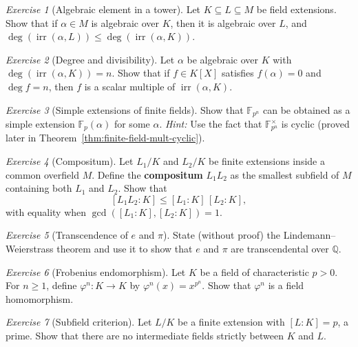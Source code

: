 \documentclass[12pt,a4paper,openany]{book}
\theoremstyle{definition}
\theoremstyle{remark}
\newtheorem{exercise}{Exercise}[chapter]
\newcommand{\Q}{\mathbb{Q}}
\newcommand{\F}{\mathbb{F}}
\renewcommand{\deg}{\operatorname{deg}}
\DeclareMathOperator{\irr}{irr}
\begin{document}
\begin{exercise}[Algebraic element in a tower]
\label{exer:algebraic-tower}
Let $K \subseteq L \subseteq M$ be field extensions. Show that if
$\alpha \in M$ is algebraic over $K$, then it is algebraic over $L$,
and $\deg(\irr(\alpha, L)) \le \deg(\irr(\alpha, K))$.
\end{exercise}

\begin{exercise}[Degree and divisibility]
\label{exer:degree-divides}
Let $\alpha$ be algebraic over $K$ with $\deg(\irr(\alpha,K)) = n$.
Show that if $f \in K[X]$ satisfies $f(\alpha) = 0$ and
$\deg f = n$, then $f$ is a scalar multiple of $\irr(\alpha,K)$.
\end{exercise}

\begin{exercise}[Simple extensions of finite fields]
\label{exer:simple-ext-finite}
Show that $\F_{p^n}$ can be obtained as a simple extension
$\F_p(\alpha)$ for some $\alpha$.
\textit{Hint:} Use the fact that $\F_{p^n}^{\times}$ is cyclic
(proved later in Theorem~\ref{thm:finite-field-mult-cyclic}).
\end{exercise}

\begin{exercise}[Compositum]
\label{exer:compositum}
Let $L_1/K$ and $L_2/K$ be finite extensions inside a common
overfield $M$. Define the \textbf{compositum} $L_1 L_2$ as the
smallest subfield of $M$ containing both $L_1$ and $L_2$. Show that
\[
  [L_1 L_2 : K] \le [L_1 : K]\,[L_2 : K],
\]
with equality when $\gcd([L_1:K], [L_2:K]) = 1$.
\end{exercise}

\begin{exercise}[Transcendence of $e$ and $\pi$]
\label{exer:transcendence}
State (without proof) the Lindemann--Weierstrass theorem and use it
to show that $e$ and $\pi$ are transcendental over $\Q$.
\end{exercise}

\begin{exercise}[Frobenius endomorphism]
\label{exer:frobenius}
Let $K$ be a field of characteristic $p > 0$. For $n \ge 1$, define
$\varphi^n \colon K \to K$ by $\varphi^n(x) = x^{p^n}$. Show that
$\varphi^n$ is a field homomorphism.
\end{exercise}

\begin{exercise}[Subfield criterion]
\label{exer:subfield-criterion}
Let $L/K$ be a finite extension with $[L:K] = p$, a prime. Show that
there are no intermediate fields strictly between $K$ and $L$.
\end{exercise}
\end{document}

